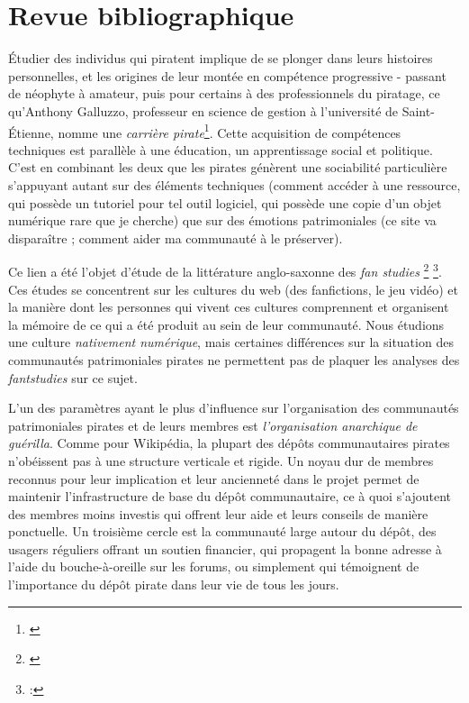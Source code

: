 \section{Revue bibliographique}

Étudier des individus qui piratent implique de se plonger dans leurs histoires personnelles, et les origines de leur montée en compétence progressive - passant de néophyte à amateur, puis pour certains à des professionnels du piratage, ce qu'Anthony Galluzzo, professeur en science de gestion à l'université de Saint-Étienne, nomme une \textit{carrière pirate}\footnote{\cite{galluzzo_longevite_2021}}. Cette acquisition de compétences techniques est parallèle à une éducation, un apprentissage social et politique. C'est en combinant les deux que les pirates génèrent une sociabilité particulière s'appuyant autant sur des éléments techniques (comment accéder à une ressource, qui possède un tutoriel pour tel outil logiciel, qui possède une copie d'un objet numérique rare que je cherche) que sur des émotions patrimoniales (ce site va disparaître ; comment aider ma communauté à le préserver). 

Ce lien a été l'objet d'étude de la littérature anglo-saxonne des \textit{fan studies} \footnote{\cite{taylor_save_nodate}} \footnote{:\cite{de_kosnik_rogue_2016}}. Ces études se concentrent sur les cultures du web (des fanfictions, le jeu vidéo) et la manière dont les personnes qui vivent ces cultures comprennent et organisent la mémoire de ce qui a été produit au sein de leur communauté. Nous étudions une culture \textit{nativement numérique}, mais certaines différences sur la situation des communautés patrimoniales pirates ne permettent pas de plaquer les analyses des \textit{fantstudies} sur ce sujet.

L'un des paramètres ayant le plus d'influence sur l'organisation des communautés patrimoniales pirates et de leurs membres est \textit{l'organisation anarchique de guérilla}. Comme pour Wikipédia, la plupart des dépôts communautaires pirates n'obéissent pas à une structure verticale et rigide. Un noyau dur de membres reconnus pour leur implication et leur ancienneté dans le projet permet de maintenir l'infrastructure de base du dépôt communautaire, ce à quoi s'ajoutent des membres moins investis qui offrent leur aide et leurs conseils de manière ponctuelle. Un troisième cercle est la communauté large autour du dépôt, des usagers réguliers offrant un soutien financier, qui propagent la bonne adresse à l'aide du bouche-à-oreille sur les forums, ou simplement qui témoignent de l'importance du dépôt pirate dans leur vie de tous les jours. 

